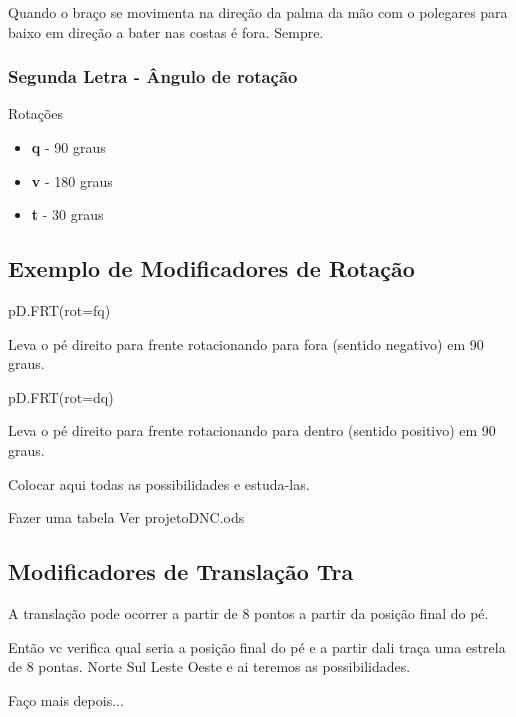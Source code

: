 Quando o braço se movimenta na direção da palma da mão com o polegares para baixo em direção a bater nas costas é fora. Sempre.


\subsubsection{Segunda Letra - Ângulo de rotação}

Rotações

\begin{itemize}
	\item \textbf{q} - 90 graus
	\item \textbf{v} - 180 graus
	\item \textbf{t} - 30 graus
\end{itemize}


\subsection{Exemplo de Modificadores de Rotação}


pD.FRT(rot=fq)

Leva o pé direito para frente rotacionando para fora (sentido negativo) em 90 graus.

pD.FRT(rot=dq)

Leva o pé direito para frente rotacionando para dentro (sentido positivo) em 90 graus.


Colocar aqui todas as possibilidades e estuda-las.


Fazer uma tabela Ver projetoDNC.ods




\subsection{Modificadores de Translação Tra}


A translação pode ocorrer a partir de 8 pontos a partir da posição final do pé.


Então vc verifica qual seria a posição final do pé e a partir dali traça uma estrela de 8 pontas. Norte Sul Leste Oeste e ai teremos as possibilidades.


Faço mais depois...



















